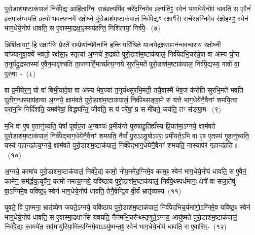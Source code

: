 पुरो॒डाश॑\-म॒ष्टा\-क॑पालं॒ निर्व॑पे॒द्य आहि॑ताग्निः॒ सन्न॑व्र॒त्यमि॑व॒ चरे॑द॒ग्निमे॒व व्र॒तप॑ति॒ꣴ॒ स्वेन॑ भाग॒धेये॒नोप॑ धावति॒ स ए॒वैनं॑ व्र॒तमाल॑म्भयति॒ व्रत्यो॑ भवत्य॒ग्नये॑ रक्षो॒घ्ने पु॑रो॒डाश॑म॒ष्टा\-क॑पालं॒ निर्व॑पे॒द्यꣳ रक्षाꣳ॑सि॒ सचे॑रन्न॒ग्निमे॒व र॑क्षो॒हण॒ꣴ॒ स्वेन॑ भाग॒धेये॒नोप॑ धावति॒ स ए॒वास्मा॒द्रक्षा॒ꣴ॒स्यप॑\-हन्ति॒ निशि॑तायां॒ निर्व॑पे॒-~(७)

न्निशि॑ताया॒ꣳ॒ हि रक्षाꣳ॑सि प्रे॒रते॑ स॒म्प्रेर्णा᳚न्ये॒वैना॑नि हन्ति॒ परि॑श्रिते याजये॒द्रक्ष॑सा॒मन॑न्ववचाराय रक्षो॒घ्नी या᳚ज्यानुवा॒क्ये॑ भवतो॒ रक्ष॑सा॒ꣴ॒ स्तृत्या॑ अ॒ग्नये॑ रु॒द्रव॑ते पुरो॒डाश॑\-म॒ष्टा\-क॑पालं॒ निर्व॑पेदभि॒चर॑न्ने॒षा वा अ॑स्य घो॒रा त॒नूर्यद्रु॒द्रस्तस्मा॑ ए॒वैन॒मावृ॑श्चति ता॒जगार्ति॒मार्च्छ॑त्य॒ग्नये॑ सुरभि॒मते॑ पुरो॒डाश॑\-म॒ष्टा\-क॑पालं॒ निर्व॑पे॒द्यस्य॒ गावो॑ वा॒ पुरु॑षा~-~(८)

वा प्र॒मीये॑र॒न्॒ यो वा॑ बिभी॒यादे॒षा वा अ॑स्य भेष॒ज्या॑ त॒नूर्यथ्सु॑रभि॒मती॒ तयै॒वास्मै॑ भेष॒जं क॑रोति सुरभि॒मते॑ भवति पूतीग॒न्धस्याप॑हत्या अ॒ग्नये॒ क्षाम॑वते पुरो॒डाश॑\-म॒ष्टा\-क॑पालं॒ निर्व॑पेथ्सङ्ग्रा॒मे सं य॑त्ते भाग॒धेये॑नै॒वैनꣳ॑ शमयि॒त्वा परा॑न॒भि निर्दि॑शति॒ यमव॑रेषां॒ विद्ध्य॑न्ति॒ जीव॑ति॒ स यं परे॑षां॒ प्र स मी॑यते॒ जय॑ति॒ तꣳ स॑ङ्ग्रा॒म-~(९)

म॒भि वा ए॒ष ए॒तानु॑च्यति॒ येषां᳚ पूर्वाप॒रा अ॒न्वञ्चः॑ प्र॒मीय॑न्ते पुरुषाहु॒तिर्ह्य॑स्य प्रि॒यत॑मा॒\-ऽग्नये॒ क्षाम॑वते पुरो॒डाश॑\-म॒ष्टा\-क॑पालं॒ निर्व॑पेद्भाग॒धेये॑नै॒वैनꣳ॑ शमयति॒ नैषां᳚ पु॒रा\-ऽऽ\-यु॒षो\-ऽप॑रः॒ प्रमी॑यते॒\-ऽभि वा ए॒ष ए॒तस्य॑ गृ॒हानु॑च्यति॒ यस्य॑ गृ॒हान्दह॑त्य॒ग्नये॒ क्षाम॑वते पुरो॒डाश॑\-म॒ष्टा\-क॑पालं॒ निर्व॑पेद्भाग॒धेये॑नै॒वैनꣳ॑ शमयति॒ नास्याप॑रं गृ॒हान्द॑हति॥~(१०)

{\anuvakamend[{व्र॒तप॑तये॒ निशि॑ताया॒न्निर्व॑पे॒त्पुरु॑षाः सङ्ग्रा॒मन्न च॒त्वारि॑ च}]}%

अ॒ग्नये॒ कामा॑य पुरो॒डाश॑\-म॒ष्टा\-क॑पालं॒ निर्व॑पे॒द्यं कामो॒ नोप॒नमे॑द॒ग्निमे॒व काम॒ꣴ॒ स्वेन॑ भाग॒धेये॒नोप॑ धावति॒ स ए॒वैनं॒ कामे॑न॒ सम॑र्द्धय॒त्युपै॑नं॒ कामो॑ नमत्य॒ग्नये॒ यवि॑ष्ठाय पुरो॒डाश॑\-म॒ष्टा\-क॑पालं॒ निर्व॑पे॒थ्स्पर्ध॑मानः॒ क्षेत्रे॑ वा सजा॒तेषु॑ वा॒\-ऽग्निमे॒व यवि॑ष्ठ॒ꣴ॒ स्वेन॑ भाग॒धेये॒नोप॑ धावति॒ तेनै॒वेन्द्रि॒यं वी॒र्यं॑ भ्रातृ॑व्यस्य~(११)

युवते॒ वि पा॒प्मना॒ भ्रातृ॑व्येण जयते॒\-ऽग्नये॒ यवि॑ष्ठाय पुरो॒डाश॑\-म॒ष्टा\-क॑पालं॒ निर्व॑पेदभिच॒र्यमा॑णो॒\-ऽग्निमे॒व यवि॑ष्ठ॒ꣴ॒ स्वेन॑ भाग॒धेये॒नोप॑ धावति॒ स ए॒वास्मा॒द्रक्षाꣳ॑सि यवयति॒ नैन॑मभि॒चर᳚न्थ्स्तृणुते॒\-ऽग्नय॒ आयु॑ष्मते पुरो॒डाश॑\-म॒ष्टा\-क॑पालं॒ निर्व॑पे॒द्यः का॒मये॑त॒ सर्व॒मायु॑रिया॒मित्य॒ग्निमे॒वा\-ऽऽ\-यु॑ष्मन्त॒ꣴ॒ स्वेन॑ भाग॒धेये॒नोप॑ धावति॒ स ए॒वास्मि॒-~(१२)

